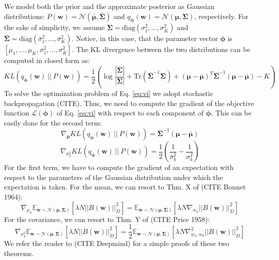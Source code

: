 \documentclass{article}
\begin{document}
We model both the prior and the approximate posterior as Gaussian distributions: $P(\bm{w}) = \mathcal{N}(\bar{\bm{\mu}},\bar{\bm{\Sigma}})$ and $q_{\bm{\phi}}(\bm{w}) = \mathcal{N}(\bm{\mu},\bm{\Sigma})$, respectively. For the sake of simplicity, we assume $\bm{\Sigma} = \text{diag}(\sigma_1^2,\dots,\sigma_K^2)$ and $\bar{\bm{\Sigma}} = \text{diag}(\bar{\sigma}_1^2,\dots,\bar{\sigma}_K^2)$. Notice, in this case, that the parameter vector $\bm{\phi}$ is $[\mu_1,\dots,\mu_K,\sigma_1^2,\dots,\sigma_K^2]$. The KL divergence between the two distributions can be computed in closed form as:
\begin{equation}
KL\left(q_{\bm{\phi}}(\bm{w})\ ||\ P(\bm{w})\right) = \frac{1}{2}\left( \log\frac{\left\lvert \bar{\bm{\Sigma}} \right\rvert}{\left\lvert \bm{\Sigma} \right\rvert} + \text{Tr}\left( \bar{\bm{\Sigma}}^{-1}\bm{\Sigma} \right) + (\bm{\mu} - \bar{\bm{\mu}})^T \bar{\bm{\Sigma}}^{-1} (\bm{\mu} - \bar{\bm{\mu}}) -K \right)
\end{equation}
To solve the optimization problem of Eq. \eqref{eq:vi} we adopt stochastic backpropagation (CITE). Thus, we need to compute the gradient of the objective function $\mathcal{L}(\bm{\phi})$ of Eq. \eqref{eq:vi} with respect to each component of $\bm{\phi}$. This can be easily done for the second term:
\begin{equation}
\nabla_{\bm{\mu}} KL\left(q_{\bm{\phi}}(\bm{w})\ ||\ P(\bm{w})\right) = \bar{\bm{\Sigma}}^{-1} (\bm{\mu} - \bar{\bm{\mu}})
\end{equation}
\begin{equation}
\nabla_{\sigma_k^2} KL\left(q_{\bm{\phi}}(\bm{w})\ ||\ P(\bm{w})\right) = \frac{1}{2}\left( \frac{1}{\bar{\sigma}_k^2} - \frac{1}{\sigma_k^2} \right)
\end{equation}
For the first term, we have to compute the gradient of an expectation with respect to the parameters of the Gaussian distribution under which the expectation is taken. For the mean, we can resort to Thm. X of (CITE Bonnet 1964):
\begin{equation}
\nabla_{\mu_k} \mathbb{E}_{\bm{w} \sim \mathcal{N}(\bm{\mu},\bm{\Sigma})}\left[ \lambda N ||B(\bm{w})||_{D}^2 \right] = \mathbb{E}_{\bm{w} \sim \mathcal{N}(\bm{\mu},\bm{\Sigma})}\left[ \lambda N \nabla_{w_k} ||B(\bm{w})||_{D}^2 \right]
\end{equation}
For the covariance, we can resort to Thm. Y of (CITE Price 1958):
\begin{equation}
\nabla_{\sigma_k^2} \mathbb{E}_{\bm{w} \sim \mathcal{N}(\bm{\mu},\bm{\Sigma})}\left[ \lambda N ||B(\bm{w})||_{D}^2 \right] = \frac{1}{2}\mathbb{E}_{\bm{w} \sim \mathcal{N}(\bm{\mu},\bm{\Sigma})}\left[ \lambda N \nabla_{w_k,w_k}^2 ||B(\bm{w})||_{D}^2 \right]
\end{equation}
We refer the reader to (CITE Deepmind) for a simple proofs of these two theorems.
\end{document}
